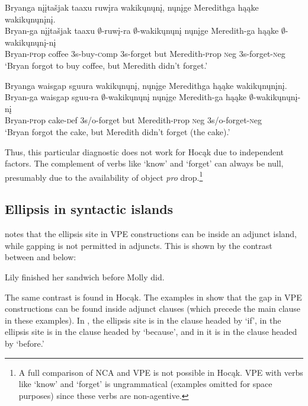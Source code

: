 \documentclass[output=paper]{LSP/langsci}
\begin{document}
 
\ea\label{ex:johnson:33}
\ea\label{ex:johnson:33a} 
\glll Bryanga {nįįtašjak taaxu} ruwįra wakikųnųnį, nųnįge Meredithga hąąke wakikųnųnįnį.\\
Bryan-ga {nįįtašjak taaxu} $\emptyset$-ruwį-ra $\emptyset$-wakikųnųnį nųnįge Meredith-ga hąąke $\emptyset$-wakikųnųnį-nį\\
Bryan-{\textsc prop} coffee {\textsc 3s}-buy-{\textsc comp} {\textsc 3s}-forget but Meredith-{\textsc prop} {\textsc neg} {\textsc 3s}-forget-{\textsc neg}\\
\trans `Bryan forgot to buy coffee, but Meredith didn't forget.'
 
\ex\label{ex:johnson:33b} 
\glll Bryanga {waisgap sguura} wakikųnųnį, nųnįge Meredithga hąąke wakikųnųnįnį.\\
Bryan-ga {waisgap sguu-ra} $\emptyset$-wakikųnųnį nųnįge Meredith-ga hąąke $\emptyset$-wakikųnųnį-nį\\
Bryan-{\textsc prop} cake-{\textsc def} {\textsc 3s/o}-forget but Meredith-{\textsc prop} {\textsc neg} {\textsc 3s/o}-forget-{\textsc neg}\\
\trans `Bryan forgot the cake, but Meredith didn't forget (the cake).'
\z
\z


Thus, this particular diagnostic does not work for Hocąk due to independent factors. The complement of verbs like `know' and `forget' can always be null, presumably due to the availability of object \emph{pro} drop.\footnote{A full comparison of NCA and VPE is not possible in Hocąk. VPE with verbs like `know' and `forget' is ungrammatical (examples omitted for space purposes) since these verbs are non-agentive.}

\subsection{Ellipsis in syntactic islands}\label{sec:johnson:3.3}

\citet{Goldberg2005} notes that the ellipsis site in VPE constructions can be inside an adjunct island, while gapping is not permitted in adjuncts. This is shown by the contrast between  and  below:
 
\ea
\ea\label{ex:johnson:34a} 
Lily finished her sandwich before Molly did.
\label{ex:johnson:34b}
\z
\z

The same contrast is found in Hocąk. The examples in  show that the gap in VPE constructions can be found inside adjunct clauses (which precede the main clause in these examples). In , the ellipsis site is in the clause headed by `if', in  the ellipsis site is in the clause headed by `because', and in  it is in the clause headed by `before.'
 
\end{document}
